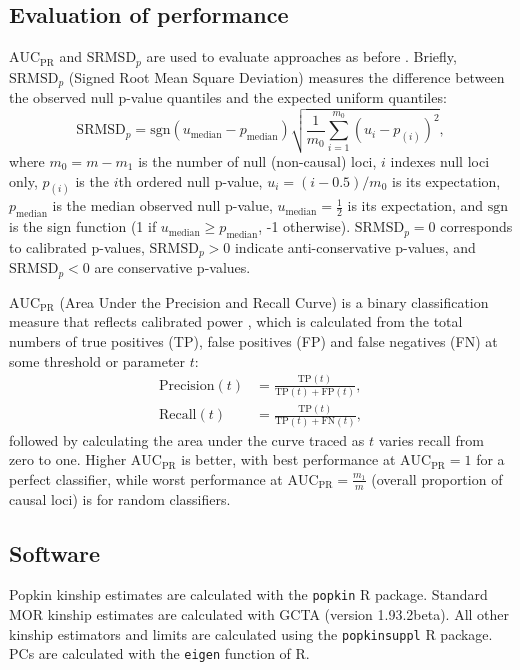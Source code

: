 \documentclass[9pt,twocolumn,twoside]{gsajnl}
\newcommand{\rmsd}{\text{SRMSD}_p}
\newcommand{\auc}{\text{AUC}_\text{PR}}
\begin{document}
\subsection{Evaluation of performance}

$\auc$ and $\rmsd$ are used to evaluate approaches as before \citep{yao_limitations_2022}.
Briefly, $\rmsd$ (Signed Root Mean Square Deviation) measures the difference between the observed null p-value quantiles and the expected uniform quantiles:
$$
\rmsd
=
\text{sgn}(u_\text{median} - p_\text{median} ) \sqrt{ \frac{1}{m_0} \sum_{i = 1}^{m_0} \left( u_i - p_{(i)} \right)^2 },
$$
where
$m_0 = m - m_1$ is the number of null (non-causal) loci,
$i$ indexes null loci only,
$p_{(i)}$ is the $i$th ordered null p-value,
$u_i = ( i - 0.5 ) / m_0$ is its expectation,
$p_\text{median}$ is the median observed null p-value,
$u_\text{median} = \frac{1}{2}$ is its expectation,
and $\text{sgn}$ is the sign function (1 if $u_\text{median} \ge p_\text{median}$, -1 otherwise).
$\rmsd = 0$ corresponds to calibrated p-values, $\rmsd > 0$ indicate anti-conservative p-values, and $\rmsd < 0$ are conservative p-values.

$\auc$ (Area Under the Precision and Recall Curve) is a binary classification measure that reflects calibrated power \citep{yao_limitations_2022}, which is calculated from the total numbers of true positives (TP), false positives (FP) and false negatives (FN) at some threshold or parameter $t$:
\begin{align*}
  \text{Precision}(t)
  &=
    \frac{ \text{TP}(t) }{ \text{TP}(t) + \text{FP}(t) }
    , \\
  \text{Recall}(t)
  &=
    \frac{ \text{TP}(t) }{ \text{TP}(t) + \text{FN}(t) }
    ,
\end{align*}
followed by calculating the area under the curve traced as $t$ varies recall from zero to one.
Higher $\auc$ is better, with best performance at $\auc = 1$ for a perfect classifier, while worst performance at $\auc = \frac{m_1}{m}$ (overall proportion of causal loci) is for random classifiers.

\subsection{Software}

Popkin kinship estimates are calculated with the \texttt{popkin} R package.
Standard MOR kinship estimates are calculated with GCTA (version 1.93.2beta).
All other kinship estimators and limits are calculated using the \texttt{popkinsuppl} R package.
PCs are calculated with the \texttt{eigen} function of R.
\end{document}
